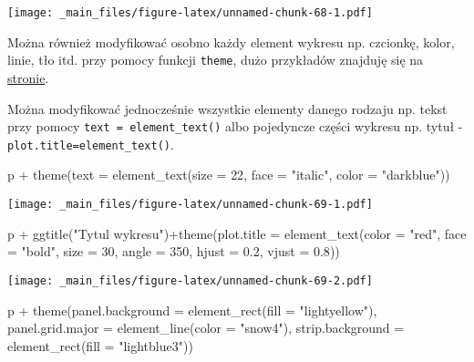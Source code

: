 \documentclass[
]{book}
\newenvironment{Shaded}{\begin{snugshade}}{\end{snugshade}}
\newcommand{\AttributeTok}[1]{\textcolor[rgb]{0.77,0.63,0.00}{#1}}
\newcommand{\DecValTok}[1]{\textcolor[rgb]{0.00,0.00,0.81}{#1}}
\newcommand{\FloatTok}[1]{\textcolor[rgb]{0.00,0.00,0.81}{#1}}
\newcommand{\FunctionTok}[1]{\textcolor[rgb]{0.00,0.00,0.00}{#1}}
\newcommand{\NormalTok}[1]{#1}
\newcommand{\SpecialCharTok}[1]{\textcolor[rgb]{0.00,0.00,0.00}{#1}}
\newcommand{\StringTok}[1]{\textcolor[rgb]{0.31,0.60,0.02}{#1}}
\begin{document}
\texttt{[image: \_main\_files/figure-latex/unnamed-chunk-68-1.pdf]}

Można również modyfikować osobno każdy element wykresu np. czcionkę, kolor, linie, tło itd. przy pomocy funkcji \texttt{theme}, dużo przykładów znajduję się na \href{http://docs.ggplot2.org/current/theme.html}{stronie}.

Można modyfikować jednocześnie wszystkie elementy danego rodzaju np. tekst przy pomocy \texttt{text\ =\ element\_text()} albo pojedyncze części wykresu np. tytuł - \texttt{plot.title=element\_text()}.

\begin{Shaded}
\begin{Highlighting}[]
\NormalTok{p }\SpecialCharTok{+} \FunctionTok{theme}\NormalTok{(}\AttributeTok{text =} \FunctionTok{element\_text}\NormalTok{(}\AttributeTok{size =} \DecValTok{22}\NormalTok{, }\AttributeTok{face =} \StringTok{"italic"}\NormalTok{, }\AttributeTok{color =} \StringTok{"darkblue"}\NormalTok{))}
\end{Highlighting}
\end{Shaded}

\texttt{[image: \_main\_files/figure-latex/unnamed-chunk-69-1.pdf]}

\begin{Shaded}
\begin{Highlighting}[]
\NormalTok{p }\SpecialCharTok{+} \FunctionTok{ggtitle}\NormalTok{(}\StringTok{"Tytul wykresu"}\NormalTok{)}\SpecialCharTok{+}\FunctionTok{theme}\NormalTok{(}\AttributeTok{plot.title =} \FunctionTok{element\_text}\NormalTok{(}\AttributeTok{color =} \StringTok{"red"}\NormalTok{, }
                                                           \AttributeTok{face =} \StringTok{"bold"}\NormalTok{, }\AttributeTok{size =} \DecValTok{30}\NormalTok{, }\AttributeTok{angle =} \DecValTok{350}\NormalTok{, }\AttributeTok{hjust =} \FloatTok{0.2}\NormalTok{, }\AttributeTok{vjust =} \FloatTok{0.8}\NormalTok{))}
\end{Highlighting}
\end{Shaded}

\texttt{[image: \_main\_files/figure-latex/unnamed-chunk-69-2.pdf]}

\begin{Shaded}
\begin{Highlighting}[]
\NormalTok{p }\SpecialCharTok{+} \FunctionTok{theme}\NormalTok{(}\AttributeTok{panel.background =} \FunctionTok{element\_rect}\NormalTok{(}\AttributeTok{fill =} \StringTok{"lightyellow"}\NormalTok{), }
          \AttributeTok{panel.grid.major =} \FunctionTok{element\_line}\NormalTok{(}\AttributeTok{color =} \StringTok{"snow4"}\NormalTok{),}
          \AttributeTok{strip.background =} \FunctionTok{element\_rect}\NormalTok{(}\AttributeTok{fill =} \StringTok{"lightblue3"}\NormalTok{))}
\end{Highlighting}
\end{Shaded}
\end{document}
